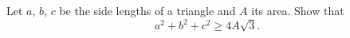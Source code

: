 Let $a$, $b$, $c$ be the side lengths of a triangle and $A$ its area. Show that
\[
a^2 + b^2 + c^2 \geq 4A\sqrt{3}.
\]
